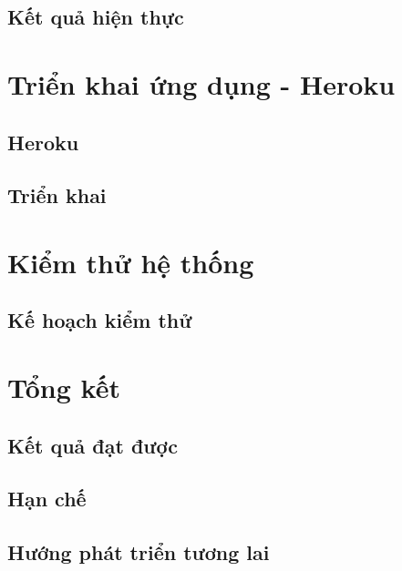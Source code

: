 \documentclass[a4paper]{article}
\begin{document}
\subsection{Kết quả hiện thực}


\newpage
\section{Triển khai ứng dụng - Heroku}
\subsection{Heroku}


\subsection{Triển khai}



\newpage
\section{Kiểm thử hệ thống}


\subsection{Kế hoạch kiểm thử}




\newpage
\section{Tổng kết}
\subsection{Kết quả đạt được}


\subsection{Hạn chế}


\subsection{Hướng phát triển tương lai}

\end{document}
